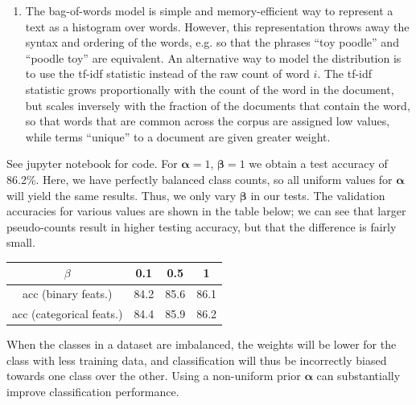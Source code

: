 \documentclass[submit]{harvardml}
\begin{document}
\begin{enumerate}[label=(\alph*)]
	\item The bag-of-words model is simple and memory-efficient way to represent a text as a histogram over words. However, this representation throws away the syntax and ordering of the words, e.g. so that the phrases ``toy poodle'' and ``poodle toy'' are equivalent. An alternative way to model the distribution is to use the tf-idf statistic instead of the raw count of word $i$. The tf-idf statistic grows proportionally with the count of the word in the document, but scales inversely with the fraction of the documents that contain the word, so that words that are common across the corpus are assigned low values, while terms ``unique'' to a document are given greater weight.
\end{enumerate}



See jupyter notebook for code. For $\bm{\alpha} = 1$, $\bm{\beta} = 1$ we obtain a test accuracy of 86.2\%. Here, we have perfectly balanced class counts, so all uniform values for $\bm{\alpha}$ will yield the same results. Thus, we only vary $\bm{\beta}$ in our tests. The validation accuracies for various values are shown in the table below; we can see that larger pseudo-counts result in higher testing accuracy, but that the difference is fairly small. 

\begin{center}
\begin{tabular}{c|c|c|c}
	$\beta$ & 0.1 & 0.5 & 1 \\ \hline
	acc	(binary feats.)	& 84.2 & 85.6 & 86.1 \\
	acc	(categorical feats.) & 84.4 & 85.9 & 86.2
\end{tabular}
\end{center}

When the classes in a dataset are imbalanced, the weights will be lower for the class with less training data, and classification will thus be incorrectly biased towards one class over the other. Using a non-uniform prior $\bm{\alpha}$ can substantially improve classification performance.
\end{document}
